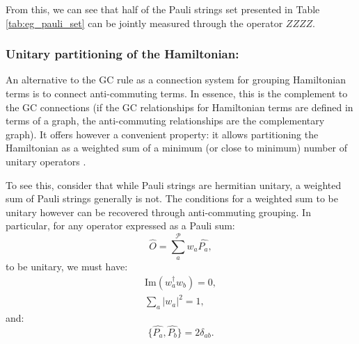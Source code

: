From this, we can see that half of the Pauli strings set presented in Table  \ref{tab:eg_pauli_set} can be jointly measured through the operator $ZZZZ$.

\subsubsection{Unitary partitioning of the Hamiltonian:} 

An alternative to the GC rule as a connection system for grouping Hamiltonian terms is to connect anti-commuting terms. In essence, this is the complement to the GC connections (if the GC relationships for Hamiltonian terms are defined in terms of a graph, the anti-commuting relationships are the complementary graph). It offers however a convenient property: it allows partitioning the Hamiltonian as a weighted sum of a minimum (or close to minimum) number of unitary operators \cite{Izmaylov2020a}.

To see this, consider that while Pauli strings are hermitian unitary, a weighted sum of Pauli strings generally is not. The conditions for a weighted sum to be unitary however can be recovered through anti-commuting grouping. In particular, for any operator expressed as a Pauli sum:
\begin{equation} \label{eq:weighted_sum_operator}
    \hat{O} = \sum_{a}^{\mathcal{P}} w_{a} \hat{P_{a}},
\end{equation}
to be unitary, we must have: 
\begin{align}
    \mathrm{Im}(w_{a}^{\dagger}w_{b}) = 0, \label{eq:real_condition}\\
    \sum_a |w_{a}|^2 = 1,\label{eq:normalized_condition}
\end{align}
and: 
\begin{equation}
    \{\hat{P_{a}}, \hat{P_{b}} \} = 2 \delta_{ab}. \label{eq:anticommute_condition}
\end{equation}

